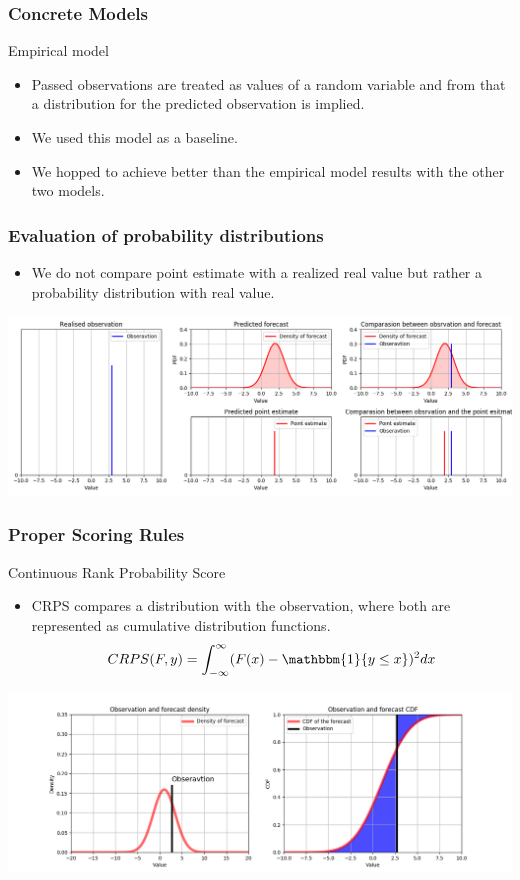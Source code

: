 \documentclass[18pt]{beamer}
\begin{document}
\begin{frame}
  \frametitle{Concrete Models}
  Empirical model
   \begin{itemize}
   \item Passed observations are treated as values of a random variable and from that a distribution for the predicted observation is implied.
   \item We used this model as a baseline.
   \item We hopped to achieve better than the empirical model results with the other two models.
   \end{itemize}

 \end{frame}

\begin{frame}
  \frametitle{Evaluation of probability distributions}
  \begin{itemize}
  \item We do not compare point estimate with a realized real value but rather a probability distribution with real value.
  \end{itemize}
  \begin{center}
    \includegraphics[scale=0.32]{images/distribution_point}
  \end{center}
\end{frame}

\begin{frame}
  \frametitle{Proper Scoring Rules}

  Continuous Rank Probability Score
  \begin{itemize}
  \item CRPS compares a distribution with the observation, where both are represented as cumulative distribution functions.
    $$  CRPS(F,y)  = \int_{-\infty}^{\infty}(F(x) - \mathbbm{1}\{y \leq x \})^2dx $$
  \end{itemize}
  \includegraphics[scale=0.35]{images/crps}
\end{frame}
\end{document}
